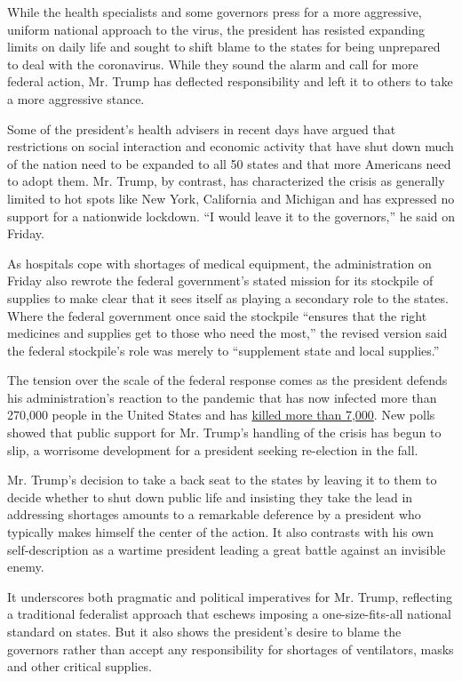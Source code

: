 While the health specialists and some governors press for a more
aggressive, uniform national approach to the virus, the president has
resisted expanding limits on daily life and sought to shift blame to the
states for being unprepared to deal with the coronavirus. While they
sound the alarm and call for more federal action, Mr. Trump has
deflected responsibility and left it to others to take a more aggressive
stance.

Some of the president's health advisers in recent days have argued that
restrictions on social interaction and economic activity that have shut
down much of the nation need to be expanded to all 50 states and that
more Americans need to adopt them. Mr. Trump, by contrast, has
characterized the crisis as generally limited to hot spots like New
York, California and Michigan and has expressed no support for a
nationwide lockdown. ``I would leave it to the governors,'' he said on
Friday.

As hospitals cope with shortages of medical equipment, the
administration on Friday also rewrote the federal government's stated
mission for its stockpile of supplies to make clear that it sees itself
as playing a secondary role to the states. Where the federal government
once said the stockpile ``ensures that the right medicines and supplies
get to those who need the most,'' the revised version said the federal
stockpile's role was merely to ``supplement state and local supplies.''

The tension over the scale of the federal response comes as the
president defends his administration's reaction to the pandemic that has
now infected more than 270,000 people in the United States and has
\href{https://www.nytimes.com/interactive/2020/us/coronavirus-us-cases.html}{killed
more than 7,000}. New polls showed that public support for Mr. Trump's
handling of the crisis has begun to slip, a worrisome development for a
president seeking re-election in the fall.

Mr. Trump's decision to take a back seat to the states by leaving it to
them to decide whether to shut down public life and insisting they take
the lead in addressing shortages amounts to a remarkable deference by a
president who typically makes himself the center of the action. It also
contrasts with his own self-description as a wartime president leading a
great battle against an invisible enemy.

It underscores both pragmatic and political imperatives for Mr. Trump,
reflecting a traditional federalist approach that eschews imposing a
one-size-fits-all national standard on states. But it also shows the
president's desire to blame the governors rather than accept any
responsibility for shortages of ventilators, masks and other critical
supplies.

